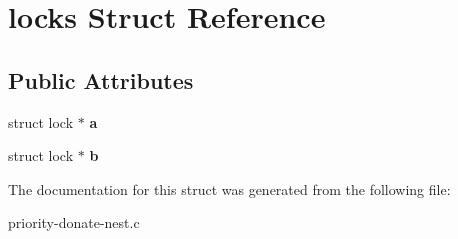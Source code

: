 \hypertarget{structlocks}{}\section{locks Struct Reference}
\label{structlocks}
\subsection*{Public Attributes}
\begin{DoxyCompactItemize}
\item 
struct lock $\ast$ {\bfseries a}\hypertarget{structlocks_aa6a6aebf0087bde6be4581ad4f8a79d8}{}\label{structlocks_aa6a6aebf0087bde6be4581ad4f8a79d8}

\item 
struct lock $\ast$ {\bfseries b}\hypertarget{structlocks_a0ffb8a0da5e33998d6cc2cc993b61151}{}\label{structlocks_a0ffb8a0da5e33998d6cc2cc993b61151}

\end{DoxyCompactItemize}


The documentation for this struct was generated from the following file\+:\begin{DoxyCompactItemize}
\item 
priority-\/donate-\/nest.\+c\end{DoxyCompactItemize}
